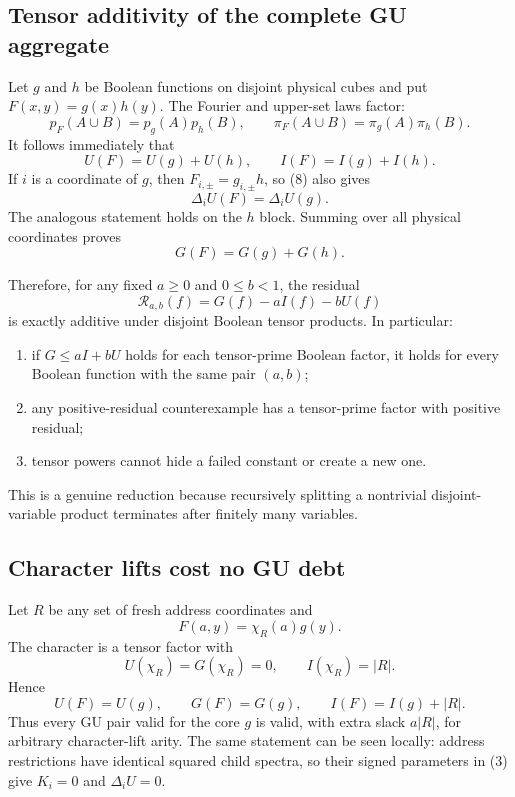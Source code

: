\subsection*{Tensor additivity of the complete GU aggregate}

Let $g$ and $h$ be Boolean functions on disjoint physical cubes and put
$F(x,y)=g(x)h(y)$.  The Fourier and upper-set laws factor:
\[
 p_F(A\cup B)=p_g(A)p_h(B),\qquad
 \pi_F(A\cup B)=\pi_g(A)\pi_h(B).                    \tag{7}
\]
It follows immediately that
\[
 \boxed{U(F)=U(g)+U(h),\qquad I(F)=I(g)+I(h).}        \tag{8}
\]
If $i$ is a coordinate of $g$, then
$F_{i,\pm}=g_{i,\pm}h$, so (8) also gives
\[
 \Delta_iU(F)=\Delta_iU(g).
\]
The analogous statement holds on the $h$ block.  Summing over all physical
coordinates proves
\[
 \boxed{G(F)=G(g)+G(h).}                              \tag{9}
\]

Therefore, for any fixed $a\ge0$ and $0\le b<1$, the residual
\[
 \mathcal R_{a,b}(f)=G(f)-aI(f)-bU(f)                 \tag{10}
\]
is exactly additive under disjoint Boolean tensor products.  In particular:

\begin{enumerate}
\item if $G\le aI+bU$ holds for each tensor-prime Boolean factor, it holds
      for every Boolean function with the same pair $(a,b)$;
\item any positive-residual counterexample has a tensor-prime factor with
      positive residual;
\item tensor powers cannot hide a failed constant or create a new one.
\end{enumerate}

This is a genuine reduction because recursively splitting a nontrivial
disjoint-variable product terminates after finitely many variables.

\subsection*{Character lifts cost no GU debt}

Let $R$ be any set of fresh address coordinates and
\[
 F(a,y)=\chi_R(a)g(y).                                \tag{11}
\]
The character is a tensor factor with
\[
 U(\chi_R)=G(\chi_R)=0,\qquad I(\chi_R)=|R|.
\]
Hence
\[
 \boxed{U(F)=U(g),\qquad G(F)=G(g),\qquad
 I(F)=I(g)+|R|.}                                      \tag{12}
\]
Thus every GU pair valid for the core $g$ is valid, with extra slack
$a|R|$, for arbitrary character-lift arity.  The same statement can be
seen locally: address restrictions have identical squared child spectra,
so their signed parameters in (3) give $K_i=0$ and $\Delta_iU=0$.

